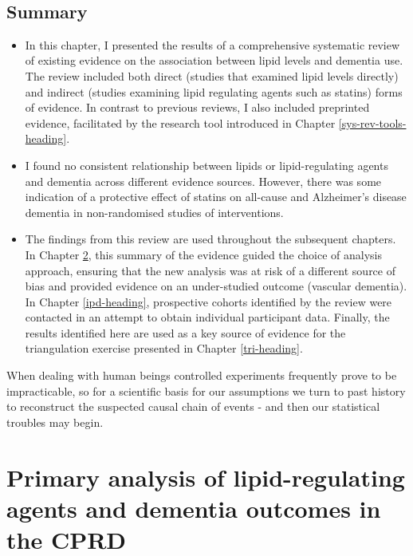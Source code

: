 \documentclass[a4paper, twoside]{templates/ociamthesis}
\begin{document}
~

\hypertarget{summary-3}{%
\section{Summary}\label{summary-3}}

\begin{itemize}
\item
  In this chapter, I presented the results of a comprehensive systematic review of existing evidence on the association between lipid levels and dementia use. The review included both direct (studies that examined lipid levels directly) and indirect (studies examining lipid regulating agents such as statins) forms of evidence. In contrast to previous reviews, I also included preprinted evidence, facilitated by the research tool introduced in Chapter \ref{sys-rev-tools-heading}.
\item
  I found no consistent relationship between lipids or lipid-regulating agents and dementia across different evidence sources. However, there was some indication of a protective effect of statins on all-cause and Alzheimer's disease dementia in non-randomised studies of interventions.
\item
  The findings from this review are used throughout the subsequent chapters. In Chapter \ref{cprd-analysis-heading}, this summary of the evidence guided the choice of analysis approach, ensuring that the new analysis was at risk of a different source of bias and provided evidence on an under-studied outcome (vascular dementia). In Chapter \ref{ipd-heading}, prospective cohorts identified by the review were contacted in an attempt to obtain individual participant data. Finally, the results identified here are used as a key source of evidence for the triangulation exercise presented in Chapter \ref{tri-heading}.
\end{itemize}

\newpage

\begin{savequote}
When dealing with human beings controlled experiments frequently prove
to be impracticable, so for a scientific basis for our assumptions we
turn to past history to reconstruct the suspected causal chain of events
- and then our statistical troubles may begin.
\end{savequote}



\hypertarget{cprd-analysis-heading}{%
\chapter{Primary analysis of lipid-regulating agents and dementia outcomes in the CPRD}\label{cprd-analysis-heading}}
\end{document}
